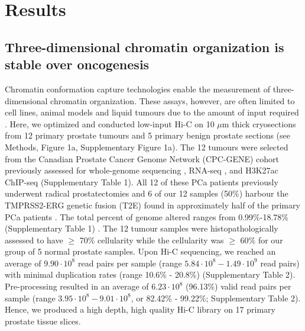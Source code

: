 \section{Results}

\subsection{Three-dimensional chromatin organization is stable over oncogenesis}

Chromatin conformation capture technologies enable the measurement of three-dimensional chromatin organization.
These assays, however, are often limited to cell lines, animal models and liquid tumours due to the amount of input required \cite{lieberman-aidenComprehensiveMappingLongRange2009}.
Here, we optimized and conducted low-input Hi-C \cite{diazChromatinConformationAnalysis2018} on 10 $\mu$m thick cryosections from 12 primary prostate tumours and 5 primary benign prostate sections (see Methods, Figure 1a, Supplementary Figure 1a).
The 12 tumours were selected from the Canadian Prostate Cancer Genome Network (CPC-GENE) cohort previously assessed for whole-genome sequencing \cite{fraserGenomicHallmarksLocalized2017}, RNA-seq \cite{chenWidespreadFunctionalRNA2019}, and H3K27ac ChIP-seq \cite{kronTMPRSS2ERGFusion2017,mazrooeiCistromePartitioningReveals2019} (Supplementary Table 1).
All 12 of these PCa patients previously underwent radical prostatectomies and 6 of our 12 samples (50\%) harbour the TMPRSS2-ERG genetic fusion (T2E) found in approximately half of the primary PCa patients \cite{fraserGenomicHallmarksLocalized2017}.
The total percent of genome altered ranges from 0.99\%-18.78\% (Supplementary Table 1) \cite{fraserGenomicHallmarksLocalized2017}.
The 12 tumour samples were histopathologically assessed to have $\ge$ 70\% cellularity while the cellularity was $\ge$ 60\% for our group of 5 normal prostate samples.
Upon Hi-C sequencing, we reached an average of $9.90 \cdot 10^8$  read pairs per sample (range $5.84 \cdot 10^8 - 1.49 \cdot 10^9$ read pairs) with minimal duplication rates (range 10.6\% - 20.8\%) (Supplementary Table 2).
Pre-processing resulted in an average of $6.23 \cdot 10^8$ (96.13\%) valid read pairs per sample (range $3.95 \cdot 10^8 - 9.01 \cdot 10^8$, or 82.42\% - 99.22\%; Supplementary Table 2).
Hence, we produced a high depth, high quality Hi-C library on 17 primary prostate tissue slices.

